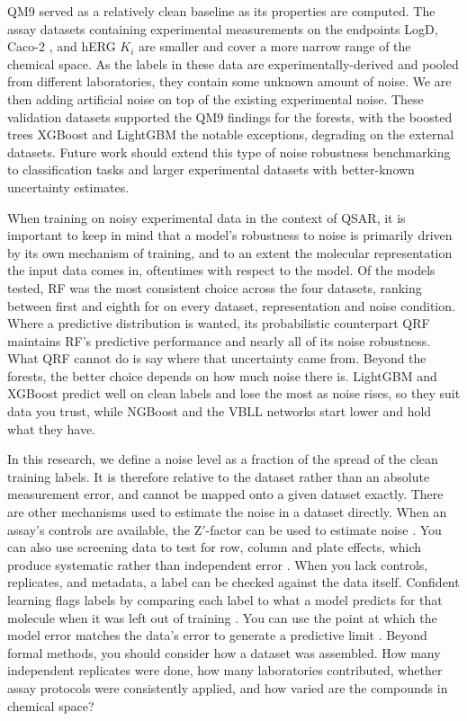 QM9 served as a relatively clean baseline as its properties are computed. The assay datasets containing experimental measurements on the endpoints LogD, Caco-2 \citep{openadmet}, and hERG $K_i$ \citep{Zdrazil2023} are smaller and cover a more narrow range of the chemical space. As the labels in these data are experimentally-derived and pooled from different laboratories, they contain some unknown amount of noise. We are then adding artificial noise on top of the existing experimental noise. These validation datasets supported the QM9 findings for the forests, with the boosted
trees XGBoost and LightGBM the notable exceptions, degrading on the external datasets. Future work should extend this type of noise robustness benchmarking to classification tasks and larger experimental datasets with better-known uncertainty estimates.

When training on noisy experimental data in the context of QSAR, it is important to keep in mind that a model's robustness to noise is primarily driven by its own mechanism of training, and to an extent the molecular representation the input data comes in, oftentimes with respect to the model. Of the models tested, RF was the most consistent choice across the four datasets, ranking between first and eighth for \aucnorm{} on every dataset, representation and noise condition. Where a predictive distribution is wanted, its probabilistic counterpart QRF maintains RF's predictive performance and nearly all of its noise robustness. What QRF cannot do is say where that uncertainty came from. Beyond the forests, the better choice depends on how much noise there is. LightGBM and XGBoost predict well on clean labels and lose the most as noise rises, so they suit data you trust, while NGBoost and the VBLL networks start lower and hold what they have.

In this research, we define a noise level as a fraction of the spread of the clean training labels. It is therefore relative to the dataset rather than an absolute measurement error, and cannot be mapped onto a given dataset exactly. There are other mechanisms used to estimate the noise in a dataset directly. When an assay's controls are available, the Z$'$-factor can be used to estimate noise \citep{Zhang1999}. You can also use screening data to test for row, column and plate effects, which produce systematic rather than independent error \citep{Caraus2015}. When you lack controls, replicates, and metadata, a label can be checked against the data itself. Confident learning flags labels by comparing each label to what a model predicts for that molecule when it was left out of training \citep{Northcutt2021}. You can use the point at which the model error matches the data's error to generate a predictive limit \citep{Kolmar2021, Crusius2024}. Beyond formal methods, you should consider how a dataset was assembled. How many independent replicates were done, how many laboratories contributed, whether assay protocols were consistently applied, and how varied are the compounds in chemical space?


